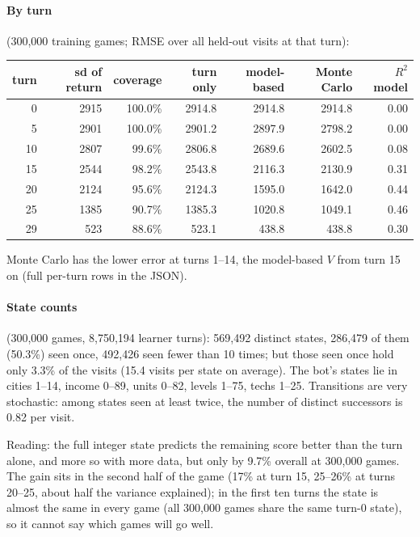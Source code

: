 \documentclass{../polyexp}
\begin{document}
\paragraph{By turn} (300{,}000 training games; RMSE over all held-out visits at that turn):

\begin{center}\small
\begin{tabular}{rrrrrrr}
\toprule
turn & sd of return & coverage & turn only & model-based & Monte Carlo & $R^2$ model \\
\midrule
0  & 2915 & 100.0\% & 2914.8 & 2914.8 & 2914.8 & 0.00 \\
5  & 2901 & 100.0\% & 2901.2 & 2897.9 & 2798.2 & 0.00 \\
10 & 2807 & 99.6\%  & 2806.8 & 2689.6 & 2602.5 & 0.08 \\
15 & 2544 & 98.2\%  & 2543.8 & 2116.3 & 2130.9 & 0.31 \\
20 & 2124 & 95.6\%  & 2124.3 & 1595.0 & 1642.0 & 0.44 \\
25 & 1385 & 90.7\%  & 1385.3 & 1020.8 & 1049.1 & 0.46 \\
29 & 523  & 88.6\%  & 523.1  & 438.8  & 438.8  & 0.30 \\
\bottomrule
\end{tabular}
\end{center}
Monte Carlo has the lower error at turns 1--14, the model-based $V$ from turn 15 on (full per-turn rows
in the JSON).

\paragraph{State counts} (300{,}000 games, 8{,}750{,}194 learner turns): 569{,}492 distinct states, 286{,}479
of them (50.3\%) seen once, 492{,}426 seen fewer than 10 times; but those seen once hold only 3.3\% of the
visits (15.4 visits per state on average). The bot's states lie in cities 1--14, income 0--89, units 0--82,
levels 1--75, techs 1--25. Transitions are very stochastic: among states seen at least twice, the number of
distinct successors is 0.82 per visit.

Reading: the full integer state predicts the remaining score better than the turn alone, and more so with more
data, but only by 9.7\% overall at 300{,}000 games. The gain sits in the second half of the game (17\% at turn
15, 25--26\% at turns 20--25, about half the variance explained); in the first ten turns the state is almost
the same in every game (all 300{,}000 games share the same turn-0 state), so it cannot say which games will go
well.
\end{document}
